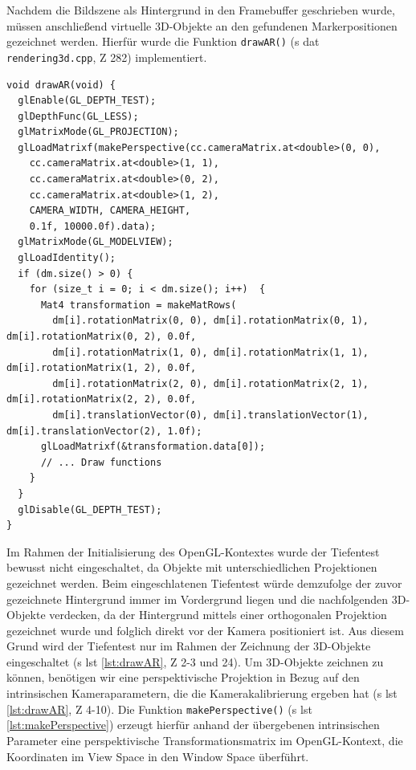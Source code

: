 Nachdem die Bildszene als Hintergrund in den Framebuffer geschrieben wurde, müssen anschließend virtuelle 3D-Objekte an den gefundenen Markerpositionen gezeichnet werden. Hierfür wurde die Funktion \texttt{drawAR()} (\acs{s} \acs{dat} \texttt{rendering3d.cpp}, \acs{Z} 282) implementiert.

\begin{lstlisting}[caption={Die Funktion \texttt{rendering3d.cpp/drawAR();} zeichnet über gefundenen Markern 3D-Objekte}, label={lst:drawAR}]
void drawAR(void) {
  glEnable(GL_DEPTH_TEST);
  glDepthFunc(GL_LESS);
  glMatrixMode(GL_PROJECTION);
  glLoadMatrixf(makePerspective(cc.cameraMatrix.at<double>(0, 0),
    cc.cameraMatrix.at<double>(1, 1),
    cc.cameraMatrix.at<double>(0, 2),
    cc.cameraMatrix.at<double>(1, 2),
    CAMERA_WIDTH, CAMERA_HEIGHT,
    0.1f, 10000.0f).data);
  glMatrixMode(GL_MODELVIEW);
  glLoadIdentity();
  if (dm.size() > 0) {
    for (size_t i = 0; i < dm.size(); i++)  {
      Mat4 transformation = makeMatRows(
        dm[i].rotationMatrix(0, 0), dm[i].rotationMatrix(0, 1), dm[i].rotationMatrix(0, 2), 0.0f,
        dm[i].rotationMatrix(1, 0), dm[i].rotationMatrix(1, 1), dm[i].rotationMatrix(1, 2), 0.0f,
        dm[i].rotationMatrix(2, 0), dm[i].rotationMatrix(2, 1), dm[i].rotationMatrix(2, 2), 0.0f,
        dm[i].translationVector(0), dm[i].translationVector(1), dm[i].translationVector(2), 1.0f);
      glLoadMatrixf(&transformation.data[0]);
      // ... Draw functions
    }
  }
  glDisable(GL_DEPTH_TEST);
}
\end{lstlisting}

\noindent Im Rahmen der Initialisierung des OpenGL-Kontextes wurde der Tiefentest bewusst nicht eingeschaltet, da Objekte mit unterschiedlichen Projektionen gezeichnet werden. Beim eingeschlatenen Tiefentest würde demzufolge der zuvor gezeichnete Hintergrund immer im Vordergrund liegen und die nachfolgenden 3D-Objekte verdecken, da der Hintergrund mittels einer orthogonalen Projektion gezeichnet wurde und folglich direkt vor der Kamera positioniert ist. Aus diesem Grund wird der Tiefentest nur im Rahmen der Zeichnung der 3D-Objekte eingeschaltet (\acs{s} \acs{lst} \ref{lst:drawAR}, \acs{Z} 2-3 und 24). Um 3D-Objekte zeichnen zu können, benötigen wir eine perspektivische Projektion in Bezug auf den intrinsischen Kameraparametern, die die Kamerakalibrierung ergeben hat (\acs{s} \acs{lst} \ref{lst:drawAR}, \acs{Z} 4-10). Die Funktion \texttt{makePerspective()} (\acs{s} \acs{lst} \ref{lst:makePerspective}) erzeugt hierfür anhand der übergebenen intrinsischen Parameter eine perspektivische Transformationsmatrix im OpenGL-Kontext, die Koordinaten im View Space in den Window Space überführt.

